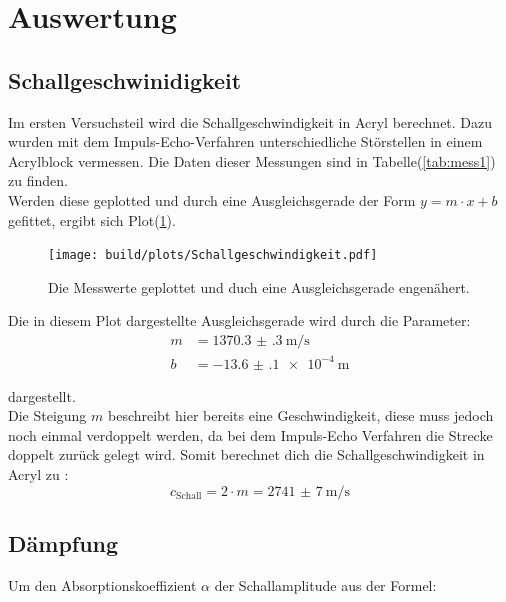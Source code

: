\section{Auswertung}

    \subsection{Schallgeschwinidigkeit}

        \noindent Im ersten Versuchsteil wird die Schallgeschwindigkeit in Acryl berechnet. Dazu wurden mit dem Impuls-Echo-Verfahren 
        unterschiedliche Störstellen in einem Acrylblock vermessen. Die Daten dieser Messungen sind in Tabelle(\ref{tab:mess1}) zu finden.\\
        Werden diese geplotted und durch eine Ausgleichsgerade der Form $y = m \cdot x + b$ gefittet, ergibt sich Plot(\ref{img:py_sch}).

        \begin{figure}[ht]
            \centering
            \texttt{[image: build/plots/Schallgeschwindigkeit.pdf]}
            \caption{Die Messwerte geplottet und duch eine Ausgleichsgerade engenähert.}
            \label{img:py_sch}
        \end{figure}

        \noindent Die in diesem Plot dargestellte Ausgleichsgerade wird durch die Parameter: 
            \begin{align*}
                m &= \SI{1370.3(3)}{\metre\per\second}\\
                b &= \SI{-13.6(1)e-4}{\metre}       
            \end{align*}
       
        dargestellt.\\
        Die Steigung $m$ beschreibt hier bereits eine Geschwindigkeit, diese muss jedoch noch einmal verdoppelt werden, da bei dem 
        Impuls-Echo Verfahren die Strecke doppelt zurück gelegt wird. Somit berechnet dich die Schallgeschwindigkeit in Acryl zu : 
        \begin{equation*}
            c_{\text{Schall}} = 2 \cdot m = \SI{2741(7)}{\metre\per\second}
        \end{equation*}
        
    \subsection{Dämpfung}

        \noindent Um den Absorptionskoeffizient $\alpha$ der Schallamplitude aus der Formel:

